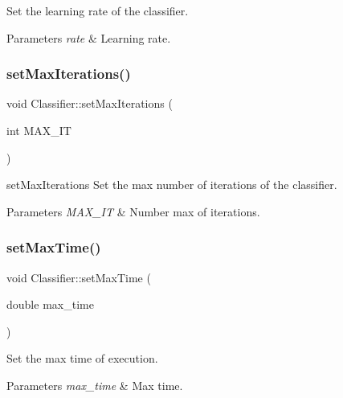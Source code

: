 Set the learning rate of the classifier. 


\begin{DoxyParams}{Parameters}
{\em rate} & Learning rate. \\
\hline
\end{DoxyParams}
\mbox{\label{class_classifier_a58540f77a22c0f1774d0089fac713498}} 
\subsubsection{\texorpdfstring{set\+Max\+Iterations()}{setMaxIterations()}}
{\footnotesize\ttfamily void Classifier\+::set\+Max\+Iterations (\begin{DoxyParamCaption}\item[{int}]{M\+A\+X\+\_\+\+IT }\end{DoxyParamCaption})}



set\+Max\+Iterations Set the max number of iterations of the classifier. 


\begin{DoxyParams}{Parameters}
{\em M\+A\+X\+\_\+\+IT} & Number max of iterations. \\
\hline
\end{DoxyParams}
\mbox{\label{class_classifier_a5da324a0de94b7171484f3b1f1f22fbd}} 
\subsubsection{\texorpdfstring{set\+Max\+Time()}{setMaxTime()}}
{\footnotesize\ttfamily void Classifier\+::set\+Max\+Time (\begin{DoxyParamCaption}\item[{double}]{max\+\_\+time }\end{DoxyParamCaption})}



Set the max time of execution. 


\begin{DoxyParams}{Parameters}
{\em max\+\_\+time} & Max time. \\
\hline
\end{DoxyParams}
\mbox{\label{class_classifier_ad8930d5e6002299bdb840d4542229f02}} 

